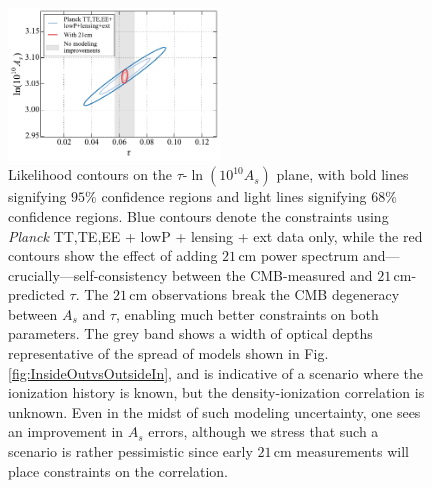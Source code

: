 \documentclass[twocolumn,aps,prd,nofootinbib,showpacs,superscriptaddress]{revtex4-1}
\begin{document}
\begin{figure}[!]
\centering
\includegraphics[width=0.5\textwidth]{figures/AsTau_w21cm.pdf}
\caption{Likelihood contours on the $\tau$-$\ln (10^{10} A_s)$ plane, with bold lines signifying $95\%$ confidence regions and light lines signifying $68\%$ confidence regions. Blue contours denote the constraints using \emph{Planck} TT,TE,EE + lowP + lensing + ext data only, while the red contours show the effect of adding $21\,\textrm{cm}$ power spectrum and---crucially---self-consistency between the CMB-measured and $21\,\textrm{cm}$-predicted $\tau$. The $21\,\textrm{cm}$ observations break the CMB degeneracy between $A_s$ and $\tau$, enabling much better constraints on both parameters. The grey band shows a width of optical depths representative of the spread of models shown in Fig. \ref{fig:InsideOutvsOutsideIn}, and is indicative of a scenario where the ionization history is known, but the density-ionization correlation is unknown. Even in the midst of such modeling uncertainty, one sees an improvement in $A_s$ errors, although we stress that such a scenario is rather pessimistic since early $21\,\textrm{cm}$ measurements will place constraints on the correlation.}
\label{fig:AsTau_w21cm}
\end{figure}

\end{document}
